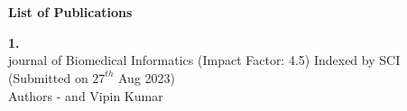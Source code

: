 
\chapter*{}
\vspace*{-3.5cm}

\vspace{11ex}
\addchaptertocentry{\listofpublication} %
    \textbf{\huge {List of Publications}}

\vspace{7ex}



\noindent\textbf{1.\ReportTitel}\\ journal of Biomedical Informatics (Impact Factor: 4.5) Indexed by SCI (Submitted on $27^{th}$ Aug 2023)\\
Authors - \fAuthor { }and  Vipin Kumar\\




\vspace*{0.7cm}

